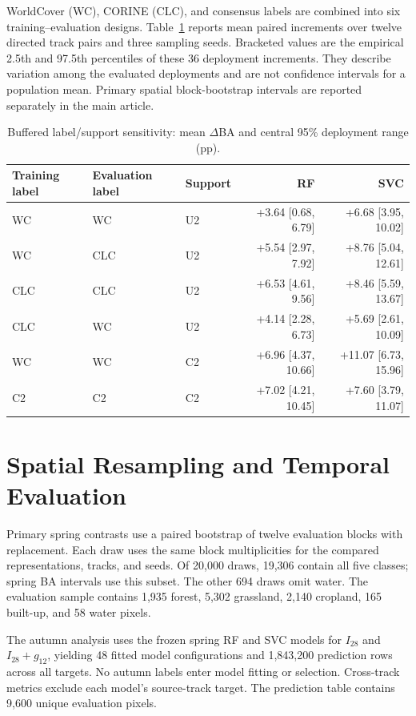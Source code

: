 \documentclass[journal]{IEEEtran}
\begin{document}
WorldCover (WC), CORINE (CLC), and consensus labels are combined into six training--evaluation designs. Table~\ref{tab:label_full} reports mean paired increments over twelve directed track pairs and three sampling seeds. Bracketed values are the empirical 2.5th and 97.5th percentiles of these 36 deployment increments. They describe variation among the evaluated deployments and are not confidence intervals for a population mean. Primary spatial block-bootstrap intervals are reported separately in the main article.
\begin{table}[!t]\centering\small
\caption{Buffered label/support sensitivity: mean $\Delta$BA and central 95\% deployment range (pp).}
\label{tab:label_full}
\begin{tabular}{lllrr}\toprule
Training label & Evaluation label & Support & RF & SVC \\\midrule
WC & WC & U2 & +3.64 [0.68, 6.79] & +6.68 [3.95, 10.02] \\
WC & CLC & U2 & +5.54 [2.97, 7.92] & +8.76 [5.04, 12.61] \\
CLC & CLC & U2 & +6.53 [4.61, 9.56] & +8.46 [5.59, 13.67] \\
CLC & WC & U2 & +4.14 [2.28, 6.73] & +5.69 [2.61, 10.09] \\
WC & WC & C2 & +6.96 [4.37, 10.66] & +11.07 [6.73, 15.96] \\
C2 & C2 & C2 & +7.02 [4.21, 10.45] & +7.60 [3.79, 11.07] \\
\bottomrule\end{tabular}\end{table}

\section{Spatial Resampling and Temporal Evaluation}
Primary spring contrasts use a paired bootstrap of twelve evaluation blocks with replacement. Each draw uses the same block multiplicities for the compared representations, tracks, and seeds. Of 20,000 draws, 19,306 contain all five classes; spring BA intervals use this subset. The other 694 draws omit water. The evaluation sample contains 1,935 forest, 5,302 grassland, 2,140 cropland, 165 built-up, and 58 water pixels.

The autumn analysis uses the frozen spring RF and SVC models for $I_{28}$ and $I_{28}+g_{12}$, yielding 48 fitted model configurations and 1,843,200 prediction rows across all targets. No autumn labels enter model fitting or selection. Cross-track metrics exclude each model's source-track target. The prediction table contains 9,600 unique evaluation pixels.
\end{document}
